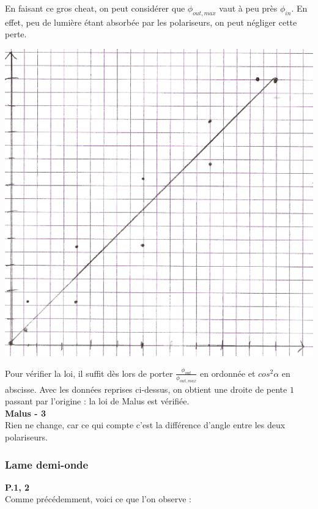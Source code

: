 \documentclass	[11pt, a4paper, openany]{book}
\begin{document}
		En faisant ce gros cheat, on peut considérer que $\phi_{out, max}$ vaut à peu près $\phi_{in}$. En effet, peu de lumière étant absorbée par les polariseurs, on peut négliger cette perte.
		\begin{center}
			\includegraphics[scale=0.5]{labo/image25.png}
		\end{center}
		Pour vérifier la loi, il suffit dès lors de porter $\frac{\phi_{out}}{\phi_{out, max}}$ en ordonnée et $cos^2\alpha$ en abscisse. Avec les données reprises ci-dessus, on obtient une droite de pente $1$ passant par l'origine : la loi de Malus est vérifiée.\\
		
		\textbf{Malus - 3}\\
		Rien ne change, car ce qui compte c'est la différence d'angle entre les deux polariseurs.
		
		\subsubsection*{Lame demi-onde}
		\textbf{P.1, 2}\\
		Comme précédemment, voici ce que l'on observe : \\
		
\end{document}
